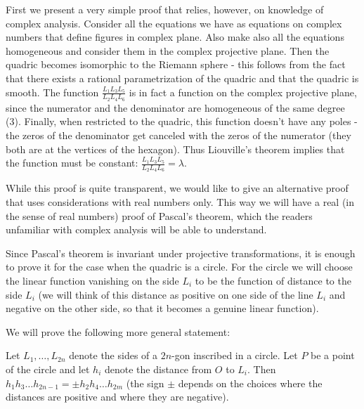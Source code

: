 First we present a very simple proof that relies, however, on knowledge of complex analysis. Consider all the equations we have as equations on complex numbers that define figures in complex plane. Also make also all the equations homogeneous and consider them in the complex projective plane. Then the quadric becomes isomorphic to the Riemann sphere - this follows from the fact that there exists a rational parametrization of the quadric and that the quadric is smooth. The function $\frac{L_1 L_3 L_5}{L_2 L_4 L_6}$ is in fact a function on the complex projective plane, since the numerator and the denominator are homogeneous of the same degree (3). Finally, when restricted to the quadric, this function doesn't have any poles - the zeros of the denominator get canceled with the zeros of the numerator (they both are at the vertices of the hexagon). Thus Liouville's theorem implies that the function must be constant: $\frac{L_1 L_3 L_5}{L_2 L_4 L_6}=\lambda$.

While this proof is quite transparent, we would like to give an alternative proof that uses considerations with real numbers only. This way we will have a real (in the sense of real numbers) proof of Pascal's theorem, which the readers unfamiliar with complex analysis will be able to understand.

Since Pascal's theorem is invariant under projective transformations, it is enough to prove it for the case when the quadric is a circle. For the circle we will choose the linear function vanishing on the side $L_i$ to be the function of distance to the side $L_i$ (we will think of this distance as positive on one side of the line $L_i$ and negative on the other side, so that it becomes a genuine linear function).

We will prove the following more general statement:

\begin{lemma}
Let $L_1,\ldots,L_{2n}$ denote the sides of a $2n$-gon inscribed in a circle. Let $P$ be a point of the circle and let $h_i$ denote the distance from $O$ to $L_i$. Then $h_1 h_3 \ldots h_{2n-1}=\pm h_2 h_4 \ldots h_{2m}$ (the sign $\pm$ depends on the choices where the distances are positive and where they are negative).
\end{lemma}

